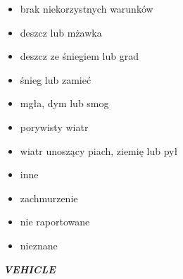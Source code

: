 \begin{itemize}
  \begin{itemize}
  \itemsep1pt\parskip0pt
  \item
    brak niekorzystnych warunków\\
  \item
    deszcz lub mżawka\\
  \item
    deszcz ze śniegiem lub grad\\
  \item
    śnieg lub zamieć\\
  \item
    mgła, dym lub smog\\
  \item
    porywisty wiatr\\
  \item
    wiatr unoszący piach, ziemię lub pył\\
  \item
    inne\\
  \item
    zachmurzenie\\
  \item
    nie raportowane\\
  \item
    nieznane
  \end{itemize}
\end{itemize}

\emph{\textbf{VEHICLE}}

